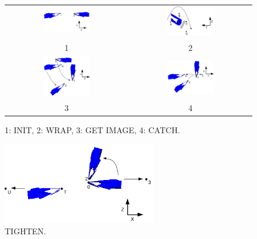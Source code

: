         \begin{figure}
            \centering
            \begin{tabular}{c|c}
            \includegraphics[width=0.4\textwidth]{01Init.png}
            &
            \includegraphics[width=0.4\textwidth]{02Wrap.png} \\
            1 & 2 \\
            \hline
            \includegraphics[width=0.4\textwidth]{03GetImage.png}
            &
            \includegraphics[width=0.4\textwidth]{04Catch.png} \\
            3 & 4 \\

            \end{tabular}
            \caption{1: INIT, 2: WRAP, 3: GET IMAGE, 4: CATCH.}
            \label{fig:TyerStates}
        \end{figure}


        \begin{figure}
        \includegraphics[width=0.6\textwidth]{05Tighten.png}
        \centering
        \caption{TIGHTEN.}
        \label{fig:TyerTighten}
        \end{figure}



